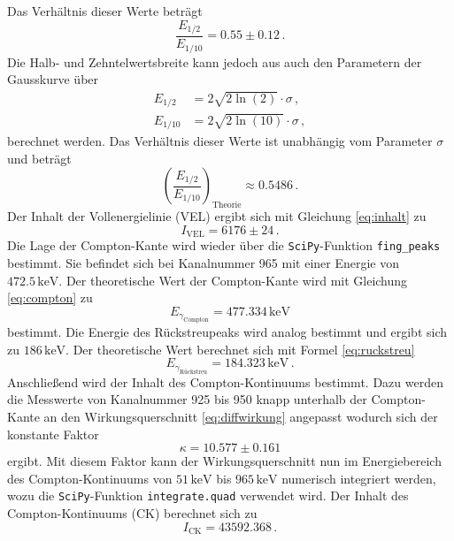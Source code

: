 Das Verhältnis dieser Werte beträgt
\begin{equation}
    \frac{E_{1/2}}{E_{1/10}} = 0.55 \pm 0.12 \, .
\end{equation}
Die Halb- und Zehntelwertsbreite kann jedoch aus auch den Parametern der Gausskurve über 
\begin{align}
    E_{1/2}  &= 2 \sqrt{2 \ln (2)} \cdot \sigma \, , \\
    E_{1/10} &= 2 \sqrt{2 \ln (10)} \cdot \sigma \, ,
\end{align}
berechnet werden. Das Verhältnis dieser Werte ist unabhängig vom Parameter $\sigma$
und beträgt
\begin{equation}
    \left(\frac{E_{1/2}}{E_{1/10}}\right)_\text{Theorie} \approx 0.5486 \, .
\end{equation}
Der Inhalt der Vollenergielinie (VEL) ergibt sich mit Gleichung \eqref{eq:inhalt} zu
\begin{equation}
    I_\text{VEL} = 6176 \pm 24 \, .
\end{equation}
Die Lage der Compton-Kante wird wieder über die \texttt{SciPy}-Funktion \texttt{fing\_peaks} bestimmt. 
Sie befindet sich bei Kanalnummer 965 mit einer Energie von $472.5 \, \text{keV}$.
Der theoretische Wert der Compton-Kante wird mit Gleichung \eqref{eq:compton} zu
\begin{equation}
    E_{\gamma_\text{Compton}} = 477.334 \, \text{keV} 
\end{equation}
bestimmt.
Die Energie des Rückstreupeaks wird analog bestimmt und ergibt sich zu $186 \, \text{keV}$.
Der theoretische Wert berechnet sich mit Formel \eqref{eq:ruckstreu}
\begin{equation}
    E_{\gamma_\text{Rückstreu}} = 184.323 \, \text{keV} \, .
\end{equation}
Anschließend wird der Inhalt des Compton-Kontinuums bestimmt.
Dazu werden die Messwerte von Kanalnummer 925 bis 950 knapp unterhalb der Compton-Kante 
an den Wirkungsquerschnitt \eqref{eq:diffwirkung} angepasst wodurch sich der konstante Faktor
\begin{equation}
    \kappa = 10.577 ± 0.161
\end{equation}
ergibt. Mit diesem Faktor kann der Wirkungsquerschnitt nun im Energiebereich des Compton-Kontinuums
von $51\, \text{keV}$ bis $965 \, \text{keV}$ 
numerisch integriert werden, wozu die \texttt{SciPy}-Funktion \texttt{integrate.quad} verwendet wird.
Der Inhalt des Compton-Kontinuums (CK) berechnet sich zu 
\begin{equation}
    I_\text{CK}  = 43592.368 \, .
\end{equation}
